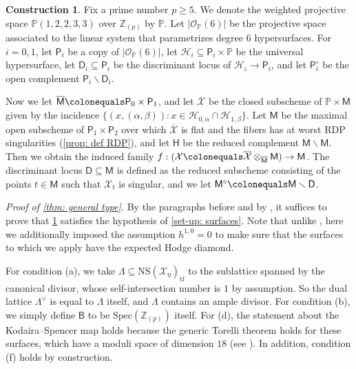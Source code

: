 \documentclass[11pt, letterpaper]{amsart}
\theoremstyle{plain}
\theoremstyle{definition}
\newtheorem{construction}[theorem]{Construction}
\newcommand{\IP}{\mathbb{P}}
\newcommand{\IZ}{\mathbb{Z}}
\newcommand{\Spec}{\mathrm{Spec}}
\newcommand{\<}{\langle}
\renewcommand{\>}{\rangle}
\newcommand{\sH}{\mathcal{H}}
\newcommand{\sO}{\mathcal{O}}
\newcommand{\NS}{\mathrm{NS}}
\newcommand{\sfD}{\mathsf{D}}
\newcommand{\sfM}{\mathsf{M}}
\newcommand{\sX}{\mathcal{X}}
\newcommand{\sfH}{\mathsf{H}}
\newcommand{\sfB}{\mathsf{B}}
\begin{document}
\begin{construction}
\label{const: general type}
    Fix a prime number $p \ge 5$.
    We denote the weighted projective space $\IP(1, 2, 2, 3, 3)$ over $\IZ_{(p)}$ by $\IP$. 
    Let $|\sO_{\IP}(6)|$ be the projective space associated to the linear system that parametrizes degree $6$ hypersurfaces. 
    For $i = 0, 1$, let $\mathsf{P}_i$ be a copy of $|\sO_{\IP}(6)|$, let $\sH_i \subseteq \mathsf{P}_i \times \IP$ be the universal hypersurface, let $\sfD_i \subseteq \mathsf{P}_i$ be the discriminant locus of $\sH_i \to \mathsf{P}_i$, and let $\mathsf{P}^\circ_i$ be the open complement $\mathsf{P}_i \smallsetminus \sfD_i$. 
    
    Now we let $\overline{\sfM} \colonequals \mathsf{P}_0 \times \mathsf{P}_1$, and let $\overline{\sX}$ be the closed subscheme of $\IP \times \overline{\sfM}$ given by the incidence $\{ (x, (\alpha, \beta)) : x \in \sH_{0, \alpha} \cap \sH_{1, \beta} \}$. 
    Let $\sfM$ be the maximal open subscheme of $\mathsf{P}_1 \times \mathsf{P}_2$ over which $\overline{\sX}$ is flat and the fibers has at worst RDP singularities (\cref{prop: def RDP}), and let $\sfH$ be the reduced complement $\overline{\sfM}\smallsetminus \sfM$.
    Then we obtain the induced family $f: (\sX\colonequals \overline{\sX}\otimes_{\overline{\sfM}} \sfM)  \to \sfM$.
    The discriminant locus $\sfD \subseteq \sfM$ is defined as the reduced subscheme consisting of the points $t\in \sfM$ such that $\sX_t$ is singular, and we let $\sfM^\circ \colonequals \sfM \smallsetminus \sfD$. 
\end{construction}


\noindent \textit{Proof of \cref{thm: general type}.} 
By the paragraphs before  and by , it suffices to prove that \cref{const: general type} satisfies the hypothesis of \cref{set-up: surfaces}. Note that unlike \cite[Thm.~C]{HYZ}, here we additionally imposed the assumption $h^{1, 0} = 0$ to make sure that the surfaces to which we apply  have the expected Hodge diamond. 

For condition (a), we take $\Lambda \subseteq \NS(\sX_\eta)_{\mathrm{tf}}$ to the sublattice spanned by the canonical divisor, whose self-intersection number is $1$ by assumption. 
So the dual lattice $\Lambda^\vee$ is equal to $\Lambda$ itself, and $\Lambda$ contains an ample divisor.
For condition (b), we simply define $\sfB$ to be $\Spec(\IZ_{(p)})$ itself. 
For (d), the statement about the Kodaira--Spencer map holds because the generic Torelli theorem holds for these surfaces, which have a moduli space of dimension $18$ (see \cite[p.1]{Catanese}). 
In addition, condition (f) holds by construction. 
\end{document}
